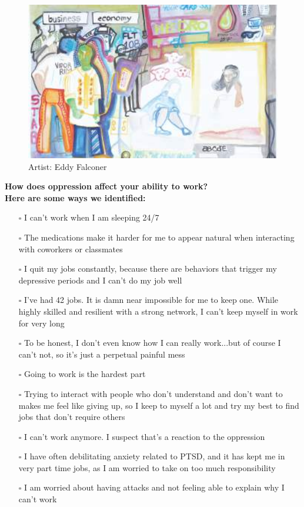 \newpage
\begin{figure}[h]
\centering
\includegraphics[width=16cm]{TeX_files/2-3.png}
\caption{Artist: Eddy Falconer}
\label{2-2}
\end{figure}

\noindent\textcolor{ProcessBlue}{\textbf{\Large{How does oppression affect your ability to work?}}}\\
\textbf{\large{Here are some ways we identified:}}
\begin{multicols}{2}
\begin{itemize}
\item[$\square$]{I can’t work when I am sleeping 24/7}
\item[$\square$]{The medications make it harder for me to appear natural when interacting with coworkers or classmates}
\item[$\square$]{I quit my jobs constantly, because there are behaviors that trigger my depressive periods and I can’t do my job well}
\item[$\square$]{I’ve had 42 jobs. It is damn near impossible for me to keep one. While highly skilled and resilient with a strong network, I can’t keep myself in work for very long}
\item[$\square$]{To be honest, I don’t even know how I can really work...but of course I can’t not, so it’s just a perpetual painful mess}
\item[$\square$]{Going to work is the hardest part}
\item[$\square$]{Trying to interact with people who don’t understand and don’t want to makes me feel like giving up, so I keep to myself a lot and try my best to find jobs that don’t require others}
\item[$\square$]{I can’t work anymore. I suspect that’s a reaction to the oppression}
\item[$\square$]{I have often debilitating anxiety related to PTSD, and it has kept me in very part time jobs, as I am worried to take on too much responsibility}
\item[$\square$]{I am worried about having attacks and not feeling able to explain why I can’t work}
\end{itemize}
\end{multicols}



